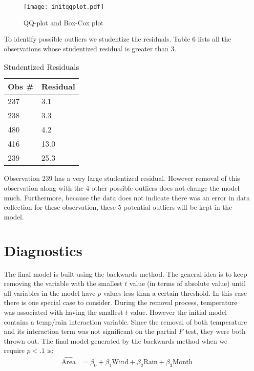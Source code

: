 \documentclass[11pt]{report}
\begin{document}
\begin{figure}[!htb]
\centering
\texttt{[image: initqqplot.pdf]}
\caption{QQ-plot and Box-Cox plot}
\end{figure}


To identify possible outliers we studentize the residuals. Table 6 lists all the observations whose studentized residual is greater than 3.
\begin{table}[!htb]
\begin{center}
    \begin{tabular}{ll}
	 Obs \# & Residual \\ \hline
	 237 &3.1 \\
	 238 &3.3\\
	 480 &4.2\\
	 416 &13.0\\
	 239 &25.3 \\
	\hline
    \end{tabular}
		\caption {Studentized Residuals}
\end{center}
\end{table}

\noindent Observation 239 has a very large studentized residual. However removal of this observation along with the 4 other possible outliers does not change the model much. Furthermore, because the data does not indicate there was an error in data collection for these observation, these 5 potential outliers will be kept in the model.


\section*{Diagnostics}
The final model is built using the backwards method. The general idea is to keep removing the variable with the smallest $t$ value (in terms of absolute value) until all variables in the model have $p$ values less than a certain threshold. In this case there is one special case to consider. During the removal process, temperature was associated with having the smallest $t$ value. However the initial model contains a temp/rain interaction variable. Since the removal of both temperature and its interaction term was not significant on the partial $F$ test, they were both thrown out.  The final model generated by the backwards method when we require $p < .1$ is:
\begin{align*}
\widehat{\text{Area}} &= \beta_0 + \beta_1 \text{Wind} + \beta_2 \text{Rain} + \beta_3 \text{Month} \tag{2}
\end{align*}
\end{document}
